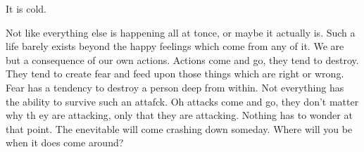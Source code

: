 It is cold.

Not like everything else is happening all at tonce, or maybe it actually is.
Such a life barely exists beyond the happy feelings which come from any of it.
We are but a consequence of our own actions. Actions come and go, they tend to
destroy. They tend to create fear and feed upon those things which are right or
wrong. Fear has a tendency to destroy a person deep from within. Not everything
has the ability to survive such an attafck. Oh attacks come and go, they don't
matter why th ey are attacking, only that they are attacking. Nothing has to
wonder at that point. The enevitable will come crashing down someday. Where will
you be when it does come around?
